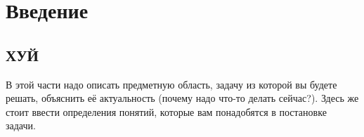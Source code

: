 \section{Введение}
\label{sec:Chapter0} 

\subsection{ХУЙ}

В этой части надо описать предметную область, задачу из которой вы будете
решать, объяснить её актуальность (почему надо что-то делать сейчас?). Здесь же
стоит ввести определения понятий, которые вам понадобятся в постановке задачи.

\newpage

